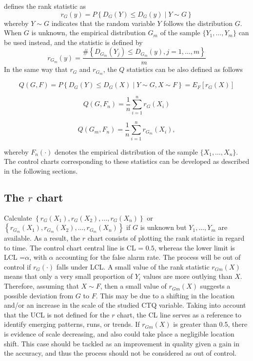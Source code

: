 \citet{liu1995control} defines the rank statistic as 
$$r_{G}\left( y\right)= P\left\lbrace D_{G}\left( Y\right) \leq D_{G}\left( y\right) \mid Y\sim G \right\rbrace$$ 
whereby $Y \sim G$ indicates that the random variable $Y$ follows the distribution $G$. When $G$ is unknown, the empirical distribution $G_{m}$ of the sample $\{Y_1, \ldots, Y_m\}$ can be used instead, and the statistic is defined by 
$$r_{G_{m}}\left( y\right)= \frac{ \# \left\lbrace D_{G_{m}}\left( Y_j\right) \leq D_{G_{m}}\left( y\right), j = 1,\ldots,m \right\rbrace}{m}$$
In the same way that $r_{G}$ and $r_{G_{m}}$, the $Q$ statistics can be also defined as follows

$$Q\left( G,F\right)= P\left\lbrace D_{G}\left( Y\right) \leq D_{G}\left( X\right) \mid Y\sim G, X\sim F \right\rbrace=E_{F}\left[ r_{G}\left( X\right) \right]$$

$$Q\left( G,F_{n}\right)= \frac{1}{n} \sum _{i=1}^{n} r_{G}\left( X_i\right)$$

$$Q\left( G_{m},F_{n}\right)= \frac{1}{n} \sum _{i=1}^{n} r_{G_{m}}\left( X_i\right),$$

\noindent whereby $F_n(\cdot)$ denotes the empirical distribution of the sample $\{X_1, \dots , X_n\}$.
The control charts corresponding to these statistics can be developed as described in the following sections.

\subsection{The $r$ chart}
Calculate $\left\lbrace r_{G}\left( X_1\right),r_{G}\left( X_2\right),\ldots,r_{G}\left( X_n\right)\right\rbrace$ or $\left\lbrace r_{G_{m}}\left( X_1\right),r_{G_{m}}\left( X_2\right),\ldots,r_{G_{m}}\left( X_n\right)\right\rbrace$ 
if $G$ is unknown but $Y_1,\ldots,Y_m$ are available. 
As a result, the $r$ chart consists of plotting the rank statistic in regard to time. 
The control chart central line is CL = $0.5$, whereas the lower limit is LCL =$\alpha$, with $\alpha$ accounting for the false alarm rate. The process will be out of control if $r_G(\cdot)$ falls under LCL. A small value of the rank statistic $r_{Gm}(X)$ means that only a very small proportion of $Y_i$ values are more outlying than $X$. Therefore, assuming that $X \sim F$, then a small value of $r_{Gm}(X)$ suggests a possible deviation from $G$ to $F$. This may be due to a shifting in the location and/or an increase in the scale of the studied CTQ variable. Taking into account that the UCL is not defined for the $r$ chart, the CL line serves as a reference to identify emerging patterns, runs, or trends. If $r_{Gm}(X)$ is greater than 0.5, there is evidence of scale decreasing, and also could take place a negligible location shift. This case should be tackled as an improvement in quality given a gain in the accuracy, and thus the process should not be considered as out of control.

